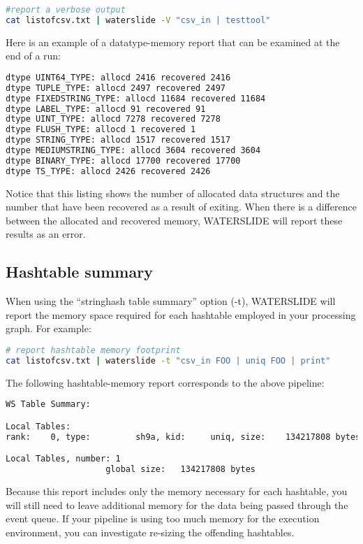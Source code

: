 \documentclass[11pt]{article}
\begin{document}
\begin{lstlisting}[language=bash]
#report a verbose output
cat listofcsv.txt | waterslide -V "csv_in | testtool"
\end{lstlisting}

Here is an example of a datatype-memory report that can be examined at the end 
of a run:
\begin{lstlisting}[language=bash]
dtype UINT64_TYPE: allocd 2416 recovered 2416
dtype TUPLE_TYPE: allocd 2497 recovered 2497
dtype FIXEDSTRING_TYPE: allocd 11684 recovered 11684
dtype LABEL_TYPE: allocd 91 recovered 91
dtype UINT_TYPE: allocd 7278 recovered 7278
dtype FLUSH_TYPE: allocd 1 recovered 1
dtype STRING_TYPE: allocd 1517 recovered 1517
dtype MEDIUMSTRING_TYPE: allocd 3604 recovered 3604
dtype BINARY_TYPE: allocd 17700 recovered 17700
dtype TS_TYPE: allocd 2426 recovered 2426
\end{lstlisting}

Notice that this listing shows the number of allocated data structures and the 
number that have been recovered as a result of exiting.  When there is a 
difference between the allocated and recovered memory, WATERSLIDE will report 
these results as an error.

\subsection{Hashtable summary}
When using the ``stringhash table summary'' option (-t), WATERSLIDE will report the memory space required for each hashtable employed in your processing
graph. For example:

\begin{lstlisting}[language=bash]
# report hashtable memory footprint
cat listofcsv.txt | waterslide -t "csv_in FOO | uniq FOO | print"
\end{lstlisting}

The following hashtable-memory report corresponds to the above pipeline:
\begin{lstlisting}[language=bash]
WS Table Summary:

Local Tables:
rank:    0, type:         sh9a, kid:     uniq, size:    134217808 bytes

Local Tables, number: 1
                    global size:   134217808 bytes
\end{lstlisting}


Because this report includes only the memory necessary for each hashtable, you will still need to
leave additional memory for the data being passed through the event queue. If your pipeline is using
too much memory for the execution environment, you can investigate re-sizing the offending
hashtables.
\end{document}
